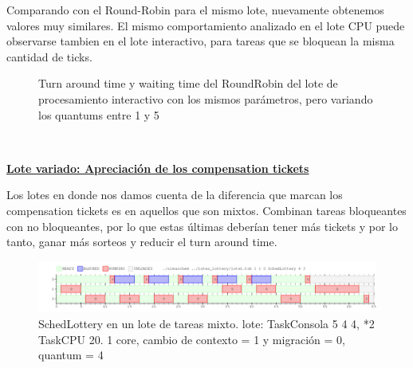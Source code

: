 Comparando con el Round-Robin para el mismo lote, nuevamente obtenemos valores muy similares. El mismo comportamiento analizado en el lote CPU puede
observarse tambien en el lote interactivo, para tareas que se bloquean la misma cantidad de ticks.

\begin{figure}
\hfill
{}
\hfill
{}
\hfill
\caption{Turn around time y waiting time del RoundRobin del lote de procesamiento interactivo con los mismos parámetros,
	pero variando los quantums entre 1 y 5}
\end{figure}

~

\textbf{\underline{Lote variado: Apreciación de los compensation tickets}}

Los lotes en donde nos damos cuenta de la diferencia que marcan los compensation tickets es en aquellos que son mixtos. Combinan tareas bloqueantes con no
bloqueantes, por lo que estas últimas deberían tener más tickets y por lo tanto, ganar más sorteos y reducir el turn around time.

\begin{figure}[H]
  \centering\includegraphics[scale=0.5]{graficos/mixto.png}
  \caption{SchedLottery en un lote de tareas mixto. lote: TaskConsola 5 4 4, *2 TaskCPU 20.
	1 core, cambio de contexto = 1 y migración = 0, quantum = 4}
\end{figure}

